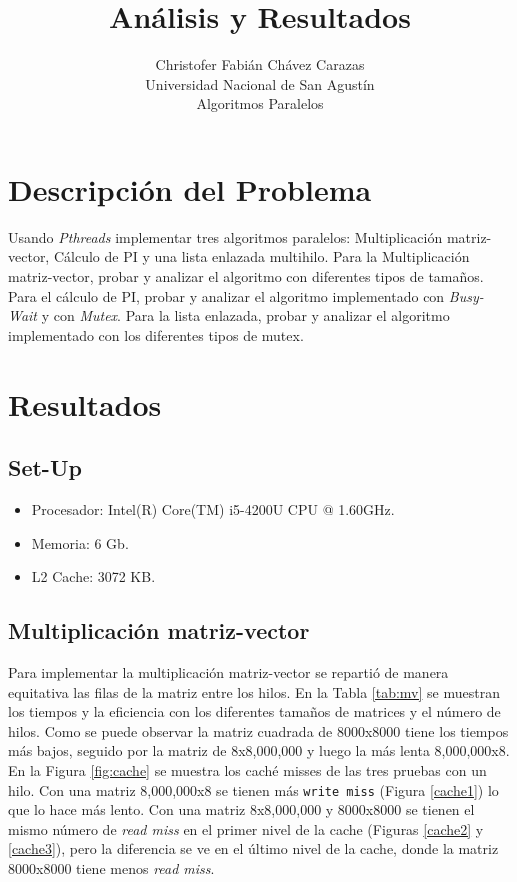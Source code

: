 \documentclass[a4paper,12pt]{article}
\begin{document}
\title{Análisis y Resultados}
\author{
Christofer Fabián Chávez Carazas \\
\small{Universidad Nacional de San Agustín} \\
\small{Algoritmos Paralelos}
}

\maketitle

\section{Descripción del Problema}

Usando \textit{Pthreads} implementar tres algoritmos paralelos: Multiplicación matriz-vector, Cálculo de PI y una lista
enlazada multihilo. Para la Multiplicación matriz-vector, probar y analizar el algoritmo con diferentes tipos de tamaños.
Para el cálculo de PI, probar y analizar el algoritmo implementado con \textit{Busy-Wait} y con \textit{Mutex}.
Para la lista enlazada, probar y analizar el algoritmo implementado con los diferentes tipos de mutex. 

\section{Resultados}

\subsection{Set-Up}
\begin{itemize}
 \item Procesador: Intel(R) Core(TM) i5-4200U CPU @ 1.60GHz.
 \item Memoria: 6 Gb.
 \item L2 Cache: 3072 KB.
\end{itemize}


\subsection{Multiplicación matriz-vector}

Para implementar la multiplicación matriz-vector se repartió de manera equitativa las filas de la matriz entre los hilos.
En la Tabla \ref{tab:mv} se muestran los tiempos y la eficiencia con los diferentes tamaños de matrices y el número de
hilos. Como se puede observar la matriz cuadrada de 8000x8000 tiene los tiempos más bajos, seguido por la matriz de 8x8,000,000 y
luego la más lenta 8,000,000x8.\\
En la Figura \ref{fig:cache} se muestra los caché misses de las tres pruebas con un hilo. Con una matriz 8,000,000x8 se tienen
más \texttt{write miss} (Figura \ref{cache1}) lo que lo hace más lento. Con una matriz 8x8,000,000 y 8000x8000 se tienen
el mismo número de \textit{read miss} en el primer nivel de la cache (Figuras \ref{cache2} y \ref{cache3}), pero la diferencia
se ve en el último nivel de la cache, donde la matriz 8000x8000 tiene menos \textit{read miss}.
\end{document}
